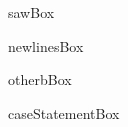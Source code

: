 \begin{figure}
\centerline{\usebox{\sawBox}}
\caption{sawBox}
\label{fig:sawBox}
\end{figure}

\begin{figure}
\centerline{\usebox{\newlinesBox}}
\caption{newlinesBox}
\label{fig:newlinesBox}
\end{figure}

\begin{figure}
\centerline{\usebox{\otherbBox}}
\caption{otherbBox}
\label{fig:otherbBox}
\end{figure}

\begin{figure}
\centerline{\usebox{\caseStatementBox}}
\caption{caseStatementBox}
\label{fig:caseStatementBox}
\end{figure}


